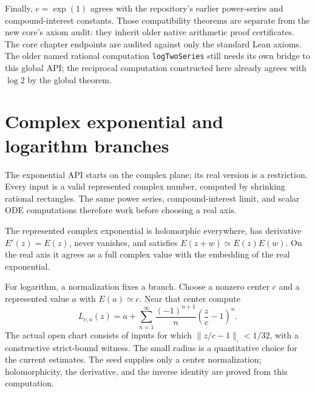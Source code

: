 \leanok

Finally, $e=\exp(1)$ agrees with the repository's earlier power-series and
compound-interest constants. Those compatibility theorems are separate from
the new core's axiom audit: they inherit older native arithmetic proof
certificates. The core chapter endpoints are audited against only the standard
Lean axioms. The older named rational computation \texttt{logTwoSeries}
still needs its own bridge to this global API; the reciprocal computation
constructed here already agrees with $\log 2$ by the global theorem.

\leanok

\section{Complex exponential and logarithm branches}\label{sec:complex-exp-log}

The exponential API starts on the complex plane; its real version is a
restriction. Every input is a valid represented complex number, computed
by shrinking rational rectangles. The same power series, compound-interest
limit, and scalar ODE computations therefore work before choosing a real axis.

\begin{theorem}
\leanok
The represented complex exponential is holomorphic everywhere, has derivative
$E'(z)=E(z)$, never vanishes, and satisfies $E(z+w)\simeq E(z)E(w)$.
On the real axis it agrees as a full complex value with the embedding of
the real exponential.
\end{theorem}

For logarithm, a normalization fixes a branch. Choose a nonzero center $c$
and a represented value $a$ with $E(a)\simeq c$. Near that center compute
\[
 L_{c,a}(z)=a+\sum_{n=1}^{\infty}\frac{(-1)^{n+1}}{n}
                    \left(\frac{z}{c}-1\right)^n.
\]
The actual open chart consists of inputs for which
$\|z/c-1\|_{\square}<1/32$, with a constructive strict-bound witness.
The small radius is a quantitative choice for the current estimates.
The seed supplies only a center normalization; holomorphicity, the derivative,
and the inverse identity are proved from this computation.

